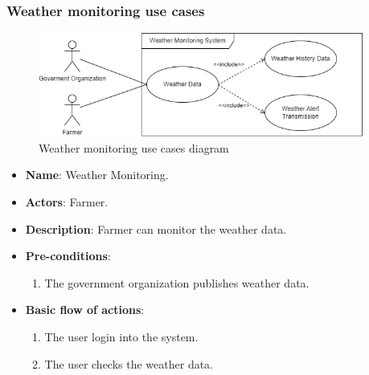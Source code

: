 \subsubsection*{Weather monitoring use cases}
\begin{figure}[H]
    \centering
    \includegraphics[width=0.95\textwidth]{./images/6/weather_uses.png}
    \caption{Weather monitoring use cases diagram}
\end{figure}
\begin{itemize}
    \item \textbf{Name}: Weather Monitoring.
    \item \textbf{Actors}: Farmer.
    \item \textbf{Description}: Farmer can monitor the weather data.
    \item \textbf{Pre-conditions}:
        \begin{enumerate}
            \item The government organization publishes weather data.
        \end{enumerate}
    \item \textbf{Basic flow of actions}:
        \begin{enumerate}
            \item The user login into the system.
            \item The user checks the weather data.
        \end{enumerate}
\end{itemize}